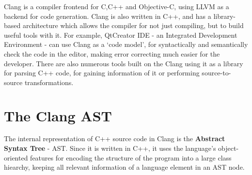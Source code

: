 \documentclass[oneside,12pt,a4paper]{book}
\begin{document}
Clang is a compiler frontend for C,C++ and Objective-C, using LLVM as a backend for code generation. Clang is also written in C++, and has a library-based architecture which allows the compiler for not just compiling, but to build useful tools with it. For example, QtCreator IDE - an Integrated Development Environment - can use Clang as a `code model', for syntactically and semantically check the code in the editor, making error correcting much easier for the developer. There are also numerous tools built on the Clang using it as a library for parsing C++ code, for gaining information of it or performing source-to-source transformations. %

\section{The Clang AST}

The internal representation of C++ source code in Clang is the \textbf{Abstract Syntax Tree} - AST\cite{Clang-AST}. Since it is written in C++, it uses the language's object-oriented features for encoding the structure of the program into a large class hiearchy, keeping all relevant information of a language element in an AST node.
\end{document}

